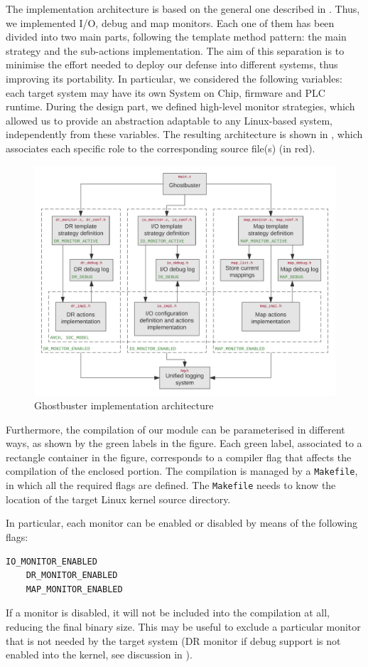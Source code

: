 The implementation architecture is based on the general one described in . Thus, we implemented I/O, debug and map monitors.
Each one of them has been divided into two main parts, following the template method pattern: the main strategy and the sub-actions implementation.
The aim of this separation is to minimise the effort needed to deploy our defense into different systems, thus improving its portability.
In particular, we considered the following variables: each target system may have its own System on Chip, firmware and PLC runtime.
During the design part, we defined high-level monitor strategies, which allowed us to provide an abstraction adaptable to any Linux-based system,
independently from these variables. The resulting architecture is shown in , which associates each specific role to the corresponding
source file(s) (in red).
\begin{figure}[h]
\centerline{\includegraphics[width=\textwidth]{res/def_impl}}
\caption{Ghostbuster implementation architecture \label{fig:def_impl}}
\end{figure}
Furthermore, the compilation of our module can be parameterised in different ways, as shown by the green labels in the figure.
Each green label, associated to a rectangle container in the figure, corresponds to a compiler flag that affects the compilation of the enclosed portion.
The compilation is managed by a \verb|Makefile|, in which all the required flags are defined.
The \verb|Makefile| needs to know the location of the target Linux kernel source directory.

In particular, each monitor can be enabled or disabled by means of the following flags:
\begin{Verbatim}[fontsize=\small]
	IO_MONITOR_ENABLED
	DR_MONITOR_ENABLED
	MAP_MONITOR_ENABLED
\end{Verbatim}
If a monitor is disabled, it will not be included into the compilation at all, reducing the final binary size.
This may be useful to exclude a particular monitor that is not needed by the target system
(\eg DR monitor if debug support is not enabled into the kernel, see discussion in ).

